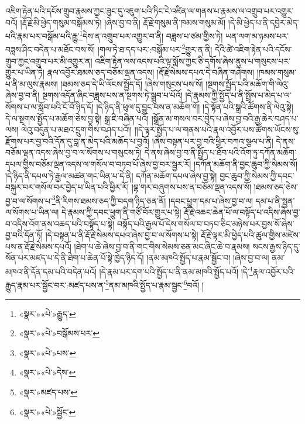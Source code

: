 འཇིག་རྟེན་པའི་དངོས་གྲུབ་རྣམས་ཀྱང་ཟུང་དུ་འཇུག་པའི་ཏིང་ངེ་འཛིན་ལ་གནས་པ་རྣམས་ལ་འགྲུབ་པར་འགྱུར་བའོ། །རྡོ་རྗེ་མི་ཕྱེད་གསུམ་བསྒོམས་ཏེ། །ཞེས་བྱ་བ་ནི། རྡོ་རྗེ་གསུམ་ནི་ཁམས་གསུམ་མོ། །དེ་མི་ཕྱེད་པ་ནི་དབྱེར་མེད་པའི་རྣམ་པར་བསྒོམ་པའི་རྒྱུ་\footnote{«སྣར་»«པེ་»རྒྱུད་}དེས་ན་འགྲུབ་པར་འགྱུར་བ་ནི། བཟླས་པ་ཙམ་གྱིས་ཏེ། ཡན་ལག་མ་ཉམས་པར་བཟླས་ཤིང་བདེན་པ་མཐོང་བས་སོ། །གལ་ཏེ་ཐ་དད་པར་:བསྒོམ་པར་\footnote{«སྣར་»«པེ་»བསྒོམས་པར་}གྱུར་ན་ནི། དེའི་ཚེ་འཇིག་རྟེན་པའི་དངོས་གྲུབ་ཀྱང་འགྲུབ་པར་མི་འགྱུར་ན། འཇིག་རྟེན་ལས་འདས་པའི་ལྟ་སྨོས་ཀྱང་ཅི་དགོས་ཞེས་ནུས་པ་གསུངས་པར་གྱུར་པ་ཡིན་ཏེ། རྣལ་འབྱོར་ཐམས་ཅད་བཅོམ་ལྡན་འདས། །རྡོ་རྗེ་སེམས་དཔའ་དེ་བཞིན་གཤེགས། །ཁམས་གསུམ་པ་ནི་མ་ལུས་རྣམས། །ཐམས་ཅད་དེ་ཡི་ལོངས་སྤྱོད་དོ། །ཞེས་གསུངས་པས་སོ། །སྔགས་སྤྱོད་པའི་མཆོག་གི་ལེའུ་ཞེས་བྱ་བ་ནི། སྔགས་འདོན་ཞིང་བཟླས་པས་ན་སྔགས་ཏེ་སྒྲུབ་པ་པོའོ། །དེ་རྣམས་ཀྱི་སྤྱོད་པ་ནི་སྤྲོས་པ་མེད་པ་ལ་སོགས་པ་ལ་སློབ་པའི་ངོ་བོ་ཉིད་དོ། །དེ་ཉིད་ནི་ཕུལ་དུ་བྱུང་བས་ན་མཆོག་གོ། །དེ་སྟོན་པའི་སྒྲའི་ཚོགས་ནི་ལེའུ་སྟེ། དེ་ལ་སྔགས་སྤྱོད་པ་མཆོག་ཅེས་བྱ་སྟེ། སྒྲ་ཇི་བཞིན་པའོ། །སྒྲོན་མ་གསལ་བར་བྱེད་པ་ཞེས་བྱ་བའི་རྒྱ་ཆེར་བཤད་པ་ལས། ལེའུ་བདུན་པ་མཐའ་དྲུག་གིས་བཤད་པའོ།། །།དེ་ལྟར་སྤྱོད་པ་ལ་གནས་པའི་རྣལ་འབྱོར་པས་ཚོགས་ཡོངས་སུ་རྫོགས་པར་བྱ་བའི་དོན་དུ་བླ་ན་མེད་པའི་མཆོད་པ་བྱའོ། །ཞེས་བསྟན་པར་བྱ་བའི་ཕྱིར་བཀའ་སྩལ་པ་ནི། དེ་ནས་བཅོམ་ལྡན་འདས་ཞེས་བྱ་བ་ལ་སོགས་པ་གསུངས་ཏེ། དེ་ནས་ཞེས་བྱ་བ་ནི་སྤྱོད་པ་ཐོབ་པའི་འོག་ཏུ་དཀོན་མཆོག་དཔལ་གྱིས་བཅོམ་ལྡན་འདས་ལ་གསོལ་བ་བཏབ་པོ་ཞེས་བྱ་བར་སྦྱར་རོ། །དཀོན་མཆོག་ནི་བྱང་ཆུབ་ཀྱི་སེམས་སོ། །དེ་ཉིད་ནི་དཔལ་ཏེ་རྒྱལ་མཚན་གང་ཡིན་པ་དེ་ནི། དཀོན་མཆོག་དཔལ་ཞེས་བྱ་སྟེ། བྱང་ཆུབ་ཀྱི་སེམས་ཀྱི་དབང་བསྐུར་བར་གསོལ་བར་བྱེད་པ་ཡིན་པའི་ཕྱིར་རོ། །བྷ་གར་བཞུགས་པས་ན་བཅོམ་ལྡན་འདས་སོ། །ཐམས་ཅད་ཅེས་བྱ་བ་ལ་སོགས་པ་\footnote{«སྣར་»«པེ་»པས་}ནི་རིགས་ཐམས་ཅད་ཀྱི་བདག་ཉིད་ཅན་ནོ། །དབང་ཕྱུག་དམ་པ་ཞེས་བྱ་བ་ལ། དམ་པ་ནི་སྤྱན་ལ་སོགས་པ་ཡིན་ལ། དེ་རྣམས་ཀྱི་དབང་ཕྱུག་ནི་གཙོ་བོར་གྱུར་པ་སྟེ། རྡོ་རྗེ་འཆང་ཆེན་པོ་ལ་བསྟོད་པ་འདིས་ཞེས་བྱ་བ་འདིས་འོག་ནས་འཆད་པའི་བསྟོད་པ་སྟེ། བསྟོད་པའི་རྒྱལ་པོ་དེས་གསོལ་བ་བཏབ་ཅིང་མཉེས་པར་བྱས་སོ་ཞེས་བྱ་བའི་དོན་ཏོ། །དེ་བསྟན་པ་ནི་རྡོ་རྗེ་སེམས་དཔའ་ཞེས་བྱ་བ་ལ་སོགས་པ་སྟེ། རྡོ་རྗེ་ལྟར་མི་ཕྱེད་པའི་ཚུལ་གྱིས་མཛེས་པས་ན་རྡོ་རྗེ་སེམས་དཔའོ། །ཐེག་པ་ཆེ་ཞེས་བྱ་བ་ནི་གང་གིས་སེམས་ཅན་མང་ཞིང་ཆེ་བ་རྣམས། སངས་རྒྱས་ཉིད་དུ་སོན་པར་མཛད་པ་དེ་ནི་ཐེག་པ་ཆེན་པོ་སྟེ་ཁྱེད་ཉིད་དོ། །ནམ་མཁའི་སྤྱོད་པ་རྣམ་སྦྱོང་བ། །ཞེས་བྱ་བ་ལ། ནམ་མཁའ་ནི་དོན་དམ་པའི་བདེན་པའོ། །དེ་རྣམ་པར་དག་པའི་སྤྱོད་པ་ནི་ནམ་མཁའི་སྤྱོད་པའོ། །དེ་\footnote{«སྣར་»«པེ་»དེས་}རྣལ་འབྱོར་པའི་རྒྱུད་རྣམ་པར་སྦྱོང་བར་:མཛད་པས་ན་\footnote{«སྣར་»མཛད་པས་}ནམ་མཁའི་སྤྱོད་པ་རྣམ་སྦྱང་\footnote{«སྣར་»«པེ་»སྦྱོང་}བའོ། །
